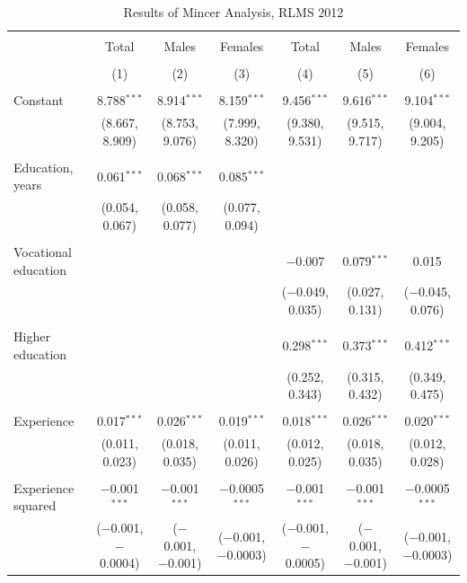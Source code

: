\documentclass[alpha-refs]{wiley-article-01g}
\begin{document}
\begin{landscape}

\fontsize{9}{11}
\selectfont

\begin{table}[!htbp] \centering 
\renewcommand{\arraystretch}{1.0}
  \caption{Results of Mincer Analysis, RLMS 2012} 
  \label{} 
\begin{tabular}{@{\extracolsep{5pt}}lcccccc} 
\\[-1.8ex]\hline 
\hline \\[-1.8ex] 
 & Total & Males & Females & Total & Males & Females \\ 
\\[-1.8ex] & (1) & (2) & (3) & (4) & (5) & (6)\\ 
\hline \\[-1.8ex] 
 Constant & 8.788$^{***}$ & 8.914$^{***}$ & 8.159$^{***}$ & 9.456$^{***}$ & 9.616$^{***}$ & 9.104$^{***}$ \\ 
  & (8.667, 8.909) & (8.753, 9.076) & (7.999, 8.320) & (9.380, 9.531) & (9.515, 9.717) & (9.004, 9.205) \\ 
  & & & & & & \\ 
 Education, years & 0.061$^{***}$ & 0.068$^{***}$ & 0.085$^{***}$ &  &  &  \\ 
  & (0.054, 0.067) & (0.058, 0.077) & (0.077, 0.094) &  &  &  \\ 
  & & & & & & \\ 
 Vocational education &  &  &  & $-$0.007 & 0.079$^{***}$ & 0.015 \\ 
  &  &  &  & ($-$0.049, 0.035) & (0.027, 0.131) & ($-$0.045, 0.076) \\ 
  & & & & & & \\ 
 Higher education &  &  &  & 0.298$^{***}$ & 0.373$^{***}$ & 0.412$^{***}$ \\ 
  &  &  &  & (0.252, 0.343) & (0.315, 0.432) & (0.349, 0.475) \\ 
  & & & & & & \\ 
 Experience & 0.017$^{***}$ & 0.026$^{***}$ & 0.019$^{***}$ & 0.018$^{***}$ & 0.026$^{***}$ & 0.020$^{***}$ \\ 
  & (0.011, 0.023) & (0.018, 0.035) & (0.011, 0.026) & (0.012, 0.025) & (0.018, 0.035) & (0.012, 0.028) \\ 
  & & & & & & \\ 
 Experience squared & $-$0.001$^{***}$ & $-$0.001$^{***}$ & $-$0.0005$^{***}$ & $-$0.001$^{***}$ & $-$0.001$^{***}$ & $-$0.0005$^{***}$ \\ 
  & ($-$0.001, $-$0.0004) & ($-$0.001, $-$0.001) & ($-$0.001, $-$0.0003) & ($-$0.001, $-$0.0005) & ($-$0.001, $-$0.001) & ($-$0.001, $-$0.0003) \\ 

\end{tabular}
\end{table}
\end{landscape}
\end{document}
